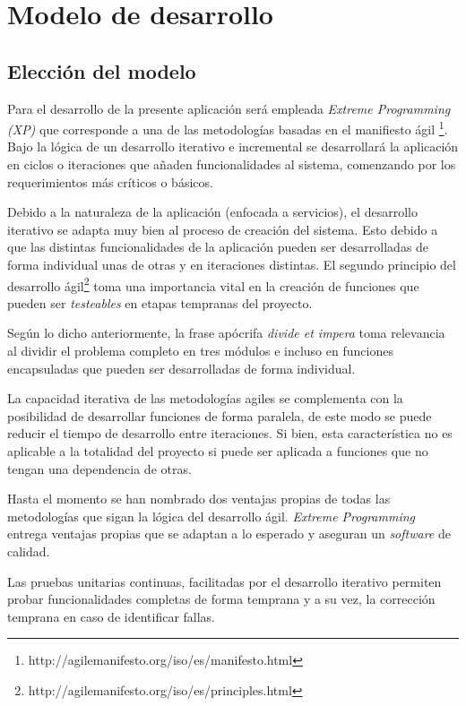 
\chapter{Modelo de desarrollo}

\section{Elección del modelo}

Para el desarrollo de la presente aplicación será empleada \emph{Extreme Programming (XP)} que corresponde a una de las metodologías basadas en el manifiesto ágil \footnote{http://agilemanifesto.org/iso/es/manifesto.html}. Bajo la lógica de un desarrollo iterativo e incremental se desarrollará la aplicación en ciclos o iteraciones que añaden funcionalidades al sistema, comenzando por los requerimientos más críticos o básicos.

Debido a la naturaleza de la aplicación (enfocada a servicios), el desarrollo iterativo se adapta muy bien al proceso de creación del sistema. Esto debido a que las distintas funcionalidades de la aplicación pueden ser desarrolladas de forma individual unas de otras y en iteraciones distintas. El segundo principio del desarrollo ágil\footnote{http://agilemanifesto.org/iso/es/principles.html} toma una importancia vital en la creación de funciones que pueden ser \emph{testeables} en etapas tempranas del proyecto. 

Según lo dicho anteriormente, la frase apócrifa \emph{divide et impera} toma relevancia al dividir el problema completo en tres módulos e incluso en funciones encapsuladas que pueden ser desarrolladas de forma individual.

La capacidad iterativa de las metodologías agiles se complementa con la posibilidad de desarrollar funciones de forma paralela, de este modo se puede reducir el tiempo de desarrollo entre iteraciones. Si bien, esta característica no es aplicable a la totalidad del proyecto si puede ser aplicada a funciones que no tengan una dependencia de otras. 

Hasta el momento se han nombrado dos ventajas propias de todas las metodologías que sigan la lógica del desarrollo ágil. \emph{Extreme Programming} entrega ventajas propias que se adaptan a lo esperado y aseguran un \emph{software} de calidad. 

Las pruebas unitarias continuas, facilitadas por el desarrollo iterativo permiten probar funcionalidades completas de forma temprana y a su vez, la corrección temprana en caso de identificar fallas.


